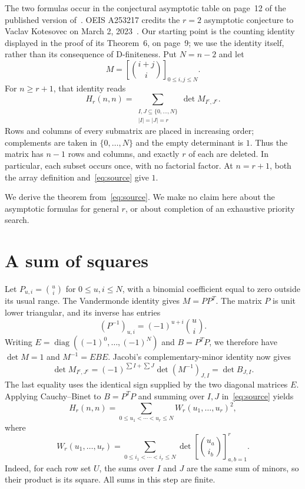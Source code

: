 \documentclass[11pt]{article}
\begin{document}
The two formulas occur in the conjectural asymptotic table on page~12
of the published version of~\cite{dk}. OEIS A253217 credits the $r=2$
asymptotic conjecture to Vaclav Kotesovec on March 2, 2023~\cite{oeis2}.
Our starting point is the
counting identity displayed in the proof of its Theorem~6, on page~9;
we use the identity itself, rather than its consequence of
D-finiteness. Put $N=n-2$ and let
\[
 M=\left[\binom{i+j}{i}\right]_{0\le i,j\le N}.
\]
For $n\ge r+1$, that identity reads
\begin{equation}\label{eq:source}
 H_r(n,n)=\sum_{\substack{I,J\subseteq\{0,\ldots,N\}\\|I|=|J|=r}}
              \det M_{I^c,J^c}.
\end{equation}
Rows and columns of every submatrix are placed in increasing order;
complements are taken in $\{0,\ldots,N\}$ and the empty determinant is
$1$. Thus the matrix has $n-1$ rows and columns, and exactly $r$ of each
are deleted. In particular, each subset occurs once, with no factorial
factor. At $n=r+1$, both the array definition and~\eqref{eq:source}
give $1$.

We derive the theorem from~\eqref{eq:source}. We make no claim here
about the asymptotic formulas for general $r$, or about completion of
an exhaustive priority search.

\section{A sum of squares}

Let $P_{u,i}=\binom ui$ for $0\le u,i\le N$, with a binomial
coefficient equal to zero outside its usual range. The Vandermonde
identity gives $M=PP^T$. The matrix $P$ is unit lower triangular, and
its inverse has entries
\[
 (P^{-1})_{u,i}=(-1)^{u+i}\binom ui.
\]
Writing $E=\operatorname{diag}((-1)^0,\ldots,(-1)^N)$ and $B=P^TP$,
we therefore have $\det M=1$ and $M^{-1}=EBE$.
Jacobi's complementary-minor identity now gives
\[
 \det M_{I^c,J^c}
 =(-1)^{\sum I+\sum J}\det(M^{-1})_{J,I}
 =\det B_{J,I}.
\]
The last equality uses the identical sign supplied by the two diagonal
matrices $E$. Applying Cauchy--Binet to $B=P^TP$ and summing over $I,J$
in~\eqref{eq:source} yields
\begin{equation}\label{eq:squares}
 H_r(n,n)=\sum_{0\le u_1<\cdots<u_r\le N}W_r(u_1,\ldots,u_r)^2,
\end{equation}
where
\begin{equation}\label{eq:W}
 W_r(u_1,\ldots,u_r)=
 \sum_{0\le i_1<\cdots<i_r\le N}
 \det\left[\binom{u_a}{i_b}\right]_{a,b=1}^r.
\end{equation}
Indeed, for each row set $U$, the sums over $I$ and $J$ are the same
sum of minors, so their product is its square. All sums in this step
are finite.
\end{document}
